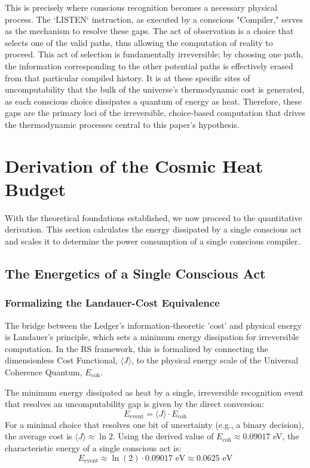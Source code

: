 \documentclass[11pt,a4paper]{article}
\theoremstyle{definition}
\theoremstyle{remark}
\begin{document}
This is precisely where conscious recognition becomes a necessary physical process. The `LISTEN` instruction, as executed by a conscious "Compiler," serves as the mechanism to resolve these gaps. The act of observation is a choice that selects one of the valid paths, thus allowing the computation of reality to proceed. This act of selection is fundamentally irreversible; by choosing one path, the information corresponding to the other potential paths is effectively erased from that particular compiled history. It is at these specific sites of uncomputability that the bulk of the universe's thermodynamic cost is generated, as each conscious choice dissipates a quantum of energy as heat. Therefore, these gaps are the primary loci of the irreversible, choice-based computation that drives the thermodynamic processes central to this paper's hypothesis.

\section{Derivation of the Cosmic Heat Budget}

With the theoretical foundations established, we now proceed to the quantitative derivation. This section calculates the energy dissipated by a single conscious act and scales it to determine the power consumption of a single conscious compiler.

\subsection{The Energetics of a Single Conscious Act}

\subsubsection{Formalizing the Landauer-Cost Equivalence}

The bridge between the Ledger's information-theoretic 'cost' and physical energy is Landauer's principle, which sets a minimum energy dissipation for irreversible computation. In the RS framework, this is formalized by connecting the dimensionless Cost Functional, \(\langle J \rangle\), to the physical energy scale of the Universal Coherence Quantum, \(E_{\text{coh}}\).

The minimum energy dissipated as heat by a single, irreversible recognition event that resolves an uncomputability gap is given by the direct conversion:
\begin{equation}
    E_{\text{event}} = \langle J \rangle \cdot E_{\text{coh}}
\end{equation}
For a minimal choice that resolves one bit of uncertainty (e.g., a binary decision), the average cost is \(\langle J \rangle \approx \ln 2\). Using the derived value of \(E_{\text{coh}} \approx 0.09017\) eV, the characteristic energy of a single conscious act is:
\begin{equation}
    E_{\text{event}} \approx \ln(2) \cdot 0.09017 \text{ eV} \approx 0.0625 \text{ eV}
\end{equation}
\end{document}
